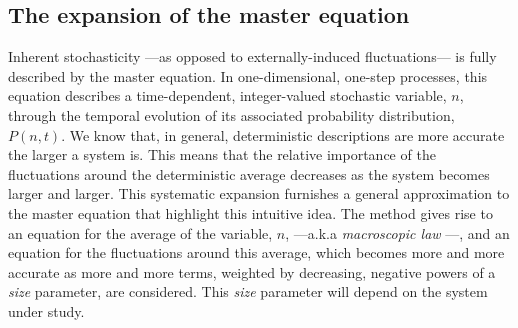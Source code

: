 \subsection{The expansion of the master equation}
\label{App:LargeN-expansion}
Inherent stochasticity ---as opposed to externally-induced fluctuations--- is fully described by the master equation. In one-dimensional, one-step processes, this equation describes a time-dependent, integer-valued stochastic variable, $n$, through the temporal evolution of its associated probability distribution, $P(n,t)$. We know that, in general, deterministic descriptions are more accurate the larger a system is. This means that the relative importance of the fluctuations around the deterministic average decreases as the system becomes larger and larger. This systematic expansion furnishes a general approximation to the master equation that highlight this intuitive idea. The method gives rise to an equation for the average of the variable, $n$, ---a.k.a {\em macroscopic law} \cite{vanKampen92}---, and an equation for the fluctuations around this average, which becomes more and more accurate as more and more terms, weighted by decreasing, negative powers of a {\em size} parameter, are considered. This {\em size} parameter will depend on the system under study. 
\smallskip

